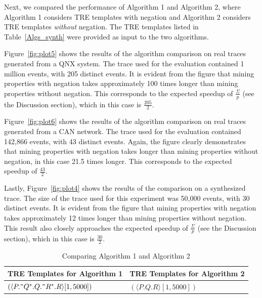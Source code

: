 \documentclass[]{sigplanconf}
\begin{document}
Next, we compared the performance of Algorithm 1 and Algorithm 2, where Algorithm 1 considers TRE templates with negation and Algorithm 2 considers TRE templates \emph{without} negation. The TRE templates listed in Table~\ref{Algs_synth} were provided as input to the two algorithms.

Figure~\ref{fig:plot5} shows the results of the algorithm comparison on real traces generated from a QNX system. The trace used for the evaluation contained 1 million events, with 205 distinct events. It is evident from the figure that mining properties with negation takes approximately 100 times longer than mining properties without negation. This corresponds to the expected speedup of $\frac{\Sigma}{p}$ (see the Discussion section), which in this case is $\frac{205}{2}$.

Figure~\ref{fig:plot6} shows the results of the algorithm comparison on real traces generated from a CAN network. The trace used for the evaluation contained 142,866 events, with 43 distinct events. Again, the figure clearly demonstrates that mining properties with negation takes longer than mining properties without negation, in this case 21.5 times longer. This corresponds to the expected speedup of $\frac{43}{2}$.

Lastly, Figure~\ref{fig:plot4} shows the results of the comparison on a synthesized trace. The size of the trace used for this experiment was 50,000 events, with 30 distinct events. It is evident from the figure that mining properties with negation takes approximately 12 times longer than mining properties without negation. This result also closely approaches the expected speedup of $\frac{\Sigma}{p}$ (see the Discussion section), which in this case is $\frac{30}{2}$.




\begin{table}[ht]
	\centering
	\begin{tabular}{|l|l|}
		\hline
		\textbf{TRE Templates for Algorithm 1} & \textbf{TRE Templates for Algorithm 2} \\
		\hline
		 $(\langle P.\verb!^!Q^*.Q.\verb!^!R^*.R \rangle [1, 5000])$& $(\langle P.Q.R \rangle [1, 5000])$ \\
	\end{tabular}

	\caption{Comparing Algorithm 1 and Algorithm 2}
	\label{miningOverhead}
\end{table}
\end{document}
